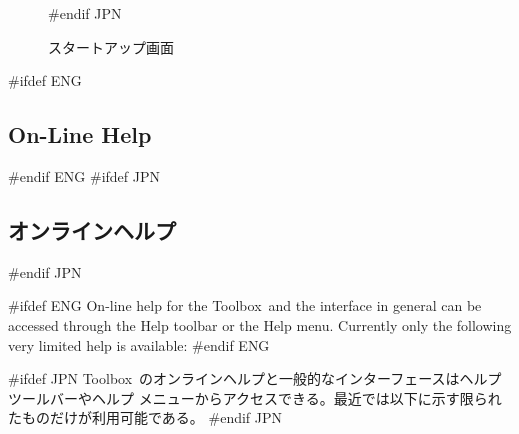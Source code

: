\documentclass[\pformat,12pt]{article}
\newcommand{\Toolbox}{Toolbox}
\newcommand{\Toolbox}{Toolbox}
\newcommand{\guicmd}[1]{{\sf #1}}
\newcommand{\guicmd}[1]{{\gt #1}}
\begin{document}
\begin{figure}[tbh]
\begin{center}
\caption{スタートアップ画面}
#endif JPN
\label{fig:startgui}
\end{center}
\end{figure}

#ifdef ENG
\subsection{On-Line Help}
#endif ENG
#ifdef JPN
\subsection{オンラインヘルプ}
#endif JPN
 
%



#ifdef ENG
On-line help for the \Toolbox\ and the interface in general can %
be accessed through the \guicmd{Help} toolbar or
the \guicmd{Help} menu. Currently only the following
very limited help is available:
#endif ENG

#ifdef JPN
\Toolbox\ のオンラインヘルプと一般的なインターフェースは\guicmd{ヘルプ}ツールバーや\guicmd{ヘルプ}
メニューからアクセスできる。最近では以下に示す限られたものだけが利用可能である。
#endif JPN
\end{document}
